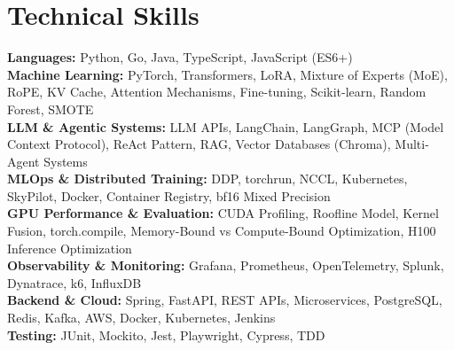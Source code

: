 \documentclass[letterpaper,11pt]{article}
\begin{document}
\section{Technical Skills}
\vspace{-2pt}
\begin{itemize}[leftmargin=0.15in, label={}]\small{\item{
\textbf{Languages:} Python, Go, Java, TypeScript, JavaScript (ES6+) \\
\textbf{Machine Learning:} PyTorch, Transformers, LoRA, Mixture of Experts (MoE), RoPE, KV Cache, Attention Mechanisms, Fine-tuning, Scikit-learn, Random Forest, SMOTE \\
\textbf{LLM \& Agentic Systems:} LLM APIs, LangChain, LangGraph, MCP (Model Context Protocol), ReAct Pattern, RAG, Vector Databases (Chroma), Multi-Agent Systems \\
\textbf{MLOps \& Distributed Training:} DDP, torchrun, NCCL, Kubernetes, SkyPilot, Docker, Container Registry, bf16 Mixed Precision \\
\textbf{GPU Performance \& Evaluation:} CUDA Profiling, Roofline Model, Kernel Fusion, torch.compile, Memory-Bound vs Compute-Bound Optimization, H100 Inference Optimization \\
\textbf{Observability \& Monitoring:} Grafana, Prometheus, OpenTelemetry, Splunk, Dynatrace, k6, InfluxDB \\
\textbf{Backend \& Cloud:} Spring, FastAPI, REST APIs, Microservices, PostgreSQL, Redis, Kafka, AWS, Docker, Kubernetes, Jenkins \\
\textbf{Testing:} JUnit, Mockito, Jest, Playwright, Cypress, TDD
}}
\end{itemize}
\end{document}
